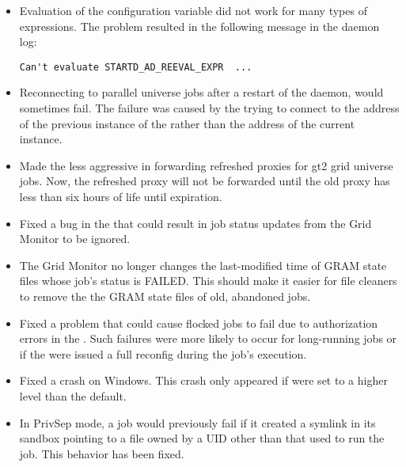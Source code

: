\begin{itemize}
\item Evaluation of the configuration variable 
did not work for many types of expressions.
The problem resulted in the following message in the 
 daemon log:

\begin{verbatim}
Can't evaluate STARTD_AD_REEVAL_EXPR  ...
\end{verbatim}

\item Reconnecting to parallel universe jobs after a restart of the
 daemon, would sometimes fail.  The failure was caused
by the  trying to connect to the address of the
previous instance of the  rather than the address of
the current instance.

\item Made the  less aggressive in forwarding refreshed
proxies for gt2 grid universe jobs. Now, the refreshed proxy will not be
forwarded until the old proxy has less than six hours of life until
expiration.

\item Fixed a bug in the  that could result in job
status updates from the Grid Monitor to be ignored.

\item The Grid Monitor no longer changes the last-modified time of GRAM
state files whose job's status is FAILED. This should make it easier for
file cleaners to remove the the GRAM state files of old, abandoned jobs.

\item Fixed a problem that could cause flocked jobs to fail due to
authorization errors in the . Such failures were more
likely to occur for long-running jobs or if the  were
issued a full reconfig during the job's execution.

\item Fixed a  crash on Windows. This crash only
appeared if  were set to a higher level than
the default.

\item In PrivSep mode, a job would previously fail if it created a
symlink in its sandbox pointing to a file owned by a UID other than
that used to run the job. This behavior has been fixed.

\end{itemize}

